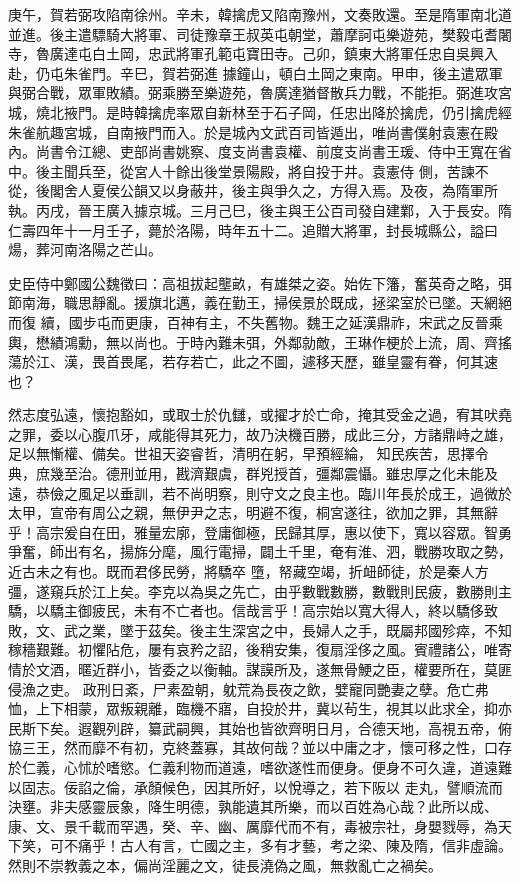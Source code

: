\begin{pinyinscope}
 庚午，賀若弼攻陷南徐州。辛未，韓擒虎又陷南豫州，文奏敗還。至是隋軍南北道並進。後主遣驃騎大將軍、司徒豫章王叔英屯朝堂，蕭摩訶屯樂遊苑，樊毅屯耆闍寺，魯廣達屯白土岡，忠武將軍孔範屯寶田寺。己卯，鎮東大將軍任忠自吳興入赴，仍屯朱雀門。辛巳，賀若弼進
 據鐘山，頓白土岡之東南。甲申，後主遣眾軍與弼合戰，眾軍敗績。弼乘勝至樂遊苑，魯廣達猶督散兵力戰，不能拒。弼進攻宮城，燒北掖門。是時韓擒虎率眾自新林至于石子岡，任忠出降於擒虎，仍引擒虎經朱雀航趣宮城，自南掖門而入。於是城內文武百司皆遁出，唯尚書僕射袁憲在殿內。尚書令江總、吏部尚書姚察、度支尚書袁權、前度支尚書王瑗、侍中王寬在省中。後主聞兵至，從宮人十餘出後堂景陽殿，將自投于井。袁憲侍
 側，苦諫不從，後閣舍人夏侯公韻又以身蔽井，後主與爭久之，方得入焉。及夜，為隋軍所執。丙戌，晉王廣入據京城。三月己巳，後主與王公百司發自建鄴，入于長安。隋仁壽四年十一月壬子，薨於洛陽，時年五十二。追贈大將軍，封長城縣公，謚曰煬，葬河南洛陽之芒山。



 史臣侍中鄭國公魏徵曰：高祖拔起壟畝，有雄桀之姿。始佐下籓，奮英奇之略，弭節南海，職思靜亂。援旗北邁，義在勤王，掃侯景於既成，拯梁室於已墜。天網絕而復
 續，國步屯而更康，百神有主，不失舊物。魏王之延漢鼎祚，宋武之反晉乘輿，懋績鴻勳，無以尚也。于時內難未弭，外鄰勍敵，王琳作梗於上流，周、齊搖蕩於江、漢，畏首畏尾，若存若亡，此之不圖，遽移天歷，雖皇靈有眷，何其速也？



 然志度弘遠，懷抱豁如，或取士於仇讎，或擢才於亡命，掩其受金之過，宥其吠堯之罪，委以心腹爪牙，咸能得其死力，故乃決機百勝，成此三分，方諸鼎峙之雄，足以無慚權、備矣。世祖天姿睿哲，清明在躬，早預經綸，
 知民疾苦，思擇令典，庶幾至治。德刑並用，戡濟艱虞，群兇授首，彊鄰震懾。雖忠厚之化未能及遠，恭儉之風足以垂訓，若不尚明察，則守文之良主也。臨川年長於成王，過微於太甲，宣帝有周公之親，無伊尹之志，明避不復，桐宮遂往，欲加之罪，其無辭乎！高宗爰自在田，雅量宏廓，登庸御極，民歸其厚，惠以使下，寬以容眾。智勇爭奮，師出有名，揚旆分麾，風行電掃，闢土千里，奄有淮、泗，戰勝攻取之勢，近古未之有也。既而君侈民勞，將驕卒
 墮，帑藏空竭，折衄師徒，於是秦人方彊，遂窺兵於江上矣。李克以為吳之先亡，由乎數戰數勝，數戰則民疲，數勝則主驕，以驕主御疲民，未有不亡者也。信哉言乎！高宗始以寬大得人，終以驕侈致敗，文、武之業，墜于茲矣。後主生深宮之中，長婦人之手，既屬邦國殄瘁，不知稼穡艱難。初懼阽危，屢有哀矜之詔，後稍安集，復扇淫侈之風。賓禮諸公，唯寄情於文酒，暱近群小，皆委之以衡軸。謀謨所及，遂無骨鯁之臣，權要所在，莫匪侵漁之吏。
 政刑日紊，尸素盈朝，躭荒為長夜之飲，嬖寵同艷妻之孽。危亡弗恤，上下相蒙，眾叛親離，臨機不寤，自投於井，冀以茍生，視其以此求全，抑亦民斯下矣。遐觀列辟，纂武嗣興，其始也皆欲齊明日月，合德天地，高視五帝，俯協三王，然而靡不有初，克終蓋寡，其故何哉？並以中庸之才，懷可移之性，口存於仁義，心怵於嗜慾。仁義利物而道遠，嗜欲遂性而便身。便身不可久違，道遠難以固志。佞諂之倫，承顏候色，因其所好，以悅導之，若下阪以
 走丸，譬順流而決壅。非夫感靈辰象，降生明德，孰能遺其所樂，而以百姓為心哉？此所以成、康、文、景千載而罕遇，癸、辛、幽、厲靡代而不有，毒被宗社，身嬰戮辱，為天下笑，可不痛乎！古人有言，亡國之主，多有才藝，考之梁、陳及隋，信非虛論。然則不崇教義之本，偏尚淫麗之文，徒長澆偽之風，無救亂亡之禍矣。




\end{pinyinscope}
